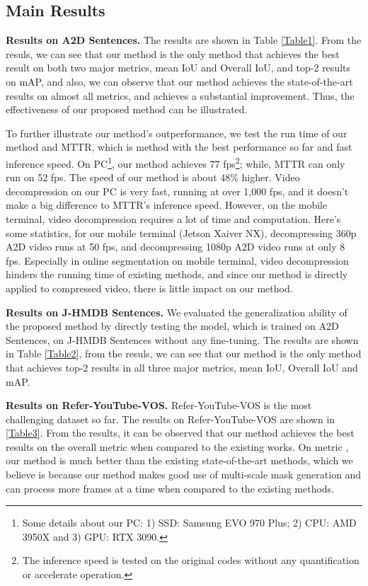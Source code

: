 \documentclass[sigconf]{acmart}
\begin{document}
\subsection{Main Results}

{\textbf{Results on A2D Sentences.}} 
The results are shown in Table \ref{Table1}. From the resuls, we can see that our method is the only method that achieves the best result on both two major metrics, mean IoU and Overall IoU, and top-2 results on mAP, and also, we can observe that our method achieves the state-of-the-art results on almost all metrics, and achieves a substantial improvement. Thus, the effectiveness of our proposed method can be illustrated. 

To further illustrate our method's outperformance, we test the run time of our method and MTTR\cite{botach2021end}, which is method with the best performance so far and fast inference speed. On PC\footnote{Some details about our PC: 1) SSD: Samsung EVO 970 Plus; 2) CPU: AMD 3950X and 3) GPU: RTX 3090.}, our method achieves 77 fps\footnote{The inference speed is tested on the original codes without any quantification or accelerate operation.}; while, MTTR can only run on 52 fps. The speed of our method is about 48\% higher. Video decompression on our PC is very fast, running at over 1,000 fps, and it doesn't make a big difference to MTTR's inference speed. However, on the mobile terminal, video decompression requires a lot of time and computation. Here's some statistics, for our mobile terminal (Jetson Xaiver NX), decompressing 360p A2D video runs at 50 fps, and decompressing 1080p A2D video runs at only 8 fps. 
Especially in online segmentation on mobile terminal, video decompression hinders the running time of existing methods, and since our method is directly applied to compressed video, there is little impact on our method.



{\textbf{Results on J-HMDB Sentences.}} We evaluated the generalization ability of the proposed method
by directly testing the model, which is trained on A2D Sentences, on J-HMDB Sentences without any fine-tuning. The results are shown in Table \ref{Table2}, from the resuls, we can see that our method is the only method that achieves top-2 results in all three major metrics, mean IoU, Overall IoU and mAP.


{\textbf{Results on Refer-YouTube-VOS.}} Refer-YouTube-VOS is the most challenging dataset so far. The results on Refer-YouTube-VOS are shown in \ref{Table3}. 
From the results, it can be observed that our method achieves the best results on the overall  metric when compared to the existing works. 
On metric , our method is much better than the existing state-of-the-art methods, which we believe is because our method makes good use of multi-scale mask generation and can process more frames at a time when compared to the existing methods.
\end{document}
